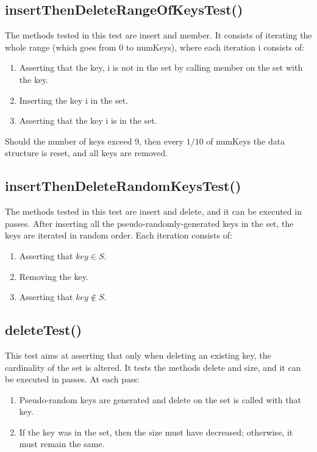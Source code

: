 \subsection{{\ttfamily insertThenDeleteRangeOfKeysTest()}}

The methods tested in this test are {\ttfamily insert} and {\ttfamily member}. It consists of iterating the whole range (which goes from $0$ to {\ttfamily numKeys}), where each iteration {\ttfamily i} consists of:
\begin{enumerate}
    \item
    Asserting that the key, {\ttfamily i} is not in the set by calling {\ttfamily member} on the set with the key.
    \item
    Inserting the key {\ttfamily i} in the set.
    \item
    Asserting that the key {\ttfamily i} is in the set.
\end{enumerate}
Should the number of keys exceed 9, then every $1/10$ of {\ttfamily numKeys} the data structure is reset, and all keys are removed.

\subsection{{\ttfamily insertThenDeleteRandomKeysTest()}}

The methods tested in this test are {\ttfamily insert} and {\ttfamily delete}, and it can be executed in passes. After inserting all the pseudo-randomly-generated keys in the set, the keys are iterated in random order. Each iteration consists of:
\begin{enumerate}
    \item
    Asserting that $key \in S$.
    \item
    Removing the key.
    \item
    Asserting that $key \not\in S$.
\end{enumerate}

\subsection{{\ttfamily deleteTest()}}

This test aims at asserting that only when deleting an existing key, the cardinality of the set is altered. It tests the methods {\ttfamily delete} and size, and it can be executed in passes. At each pass:
\begin{enumerate}
    \item
    Pseudo-random keys are generated and delete on the set is called with that key.
    \item
    If the key was in the set, then the size must have decreased; otherwise, it must remain the same.
\end{enumerate}

